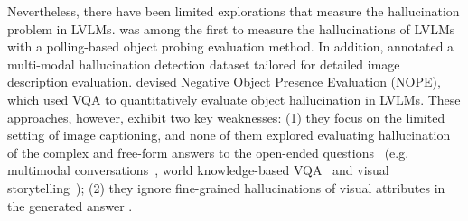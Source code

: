 Nevertheless, there have been limited explorations that 
measure the hallucination problem in LVLMs. \citet{Li2023EvaluatingOH} was among the first to measure the hallucinations of LVLMs with a polling-based object probing evaluation method. 
In addition, \citet{gunjal2023detecting} annotated a multi-modal hallucination detection dataset tailored for detailed image description evaluation. \citet{lovenia2023negative} devised Negative Object Presence Evaluation (NOPE), which used VQA to quantitatively evaluate object hallucination in LVLMs. 
These approaches, however, exhibit two key weaknesses:
(1) they focus on the limited setting of image captioning, and none of them explored evaluating hallucination of the complex and free-form answers to the open-ended questions~\cite{OpenAI2023GPT4V} (e.g. multimodal conversations~\cite{llava,DBLP:conf/acl-convai/SundarH22}, world knowledge-based VQA~\cite{AOKVQA} and visual storytelling~\cite{Huang2016VisualStory});
(2) they ignore fine-grained hallucinations of visual attributes in the generated answer \cite{liu2024mitigating,DBLP:conf/emnlp/RohrbachHBDS18}. 


